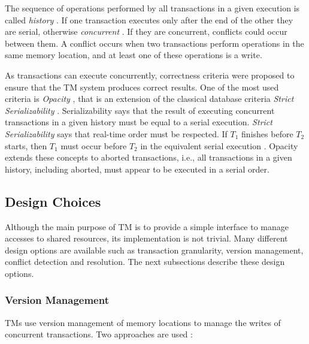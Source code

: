 The sequence of operations performed by all transactions in a given execution is called \emph{history} \cite{Opacity}. If one transaction executes only after the end of the other they are serial, otherwise \emph{concurrent} \cite{Harris:2010}. If they are concurrent, conflicts could occur between them. A conflict occurs when two transactions perform operations in the same memory location, and at least one of these operations is a write. 

As transactions can execute concurrently, correctness criteria were proposed to ensure that the TM system produces correct results. One of the most used criteria is \emph{Opacity} \cite{Opacity}, that is an extension of the classical database criteria \emph{Strict Serializability} \cite{Papadimitriou:1979}. Serializability says that the result of executing concurrent transactions in a given history must be equal to a serial execution. \emph{Strict Serializability} says that real-time order must be respected. If $T_1$ finishes before $T_2$ starts, then $T_1$ must occur before $T_2$ in the equivalent serial execution \cite{Harris:2010}. Opacity extends these concepts to aborted transactions, i.e., all transactions in a given history, including aborted, must appear to be executed in a serial order. %

\subsection{Design Choices}\label{sec:TMDesignChoices}

Although the main purpose of TM is to provide a simple interface to manage accesses to shared resources, its implementation is not trivial. Many different design options are available such as transaction granularity, version management, conflict detection and resolution. The next subsections describe these design options.

\subsubsection{Version Management}\label{sec:versionManag}

TMs use version management of memory locations to manage the writes of concurrent transactions. Two approaches are used \cite{Harris:2010, TinySTM2}:

